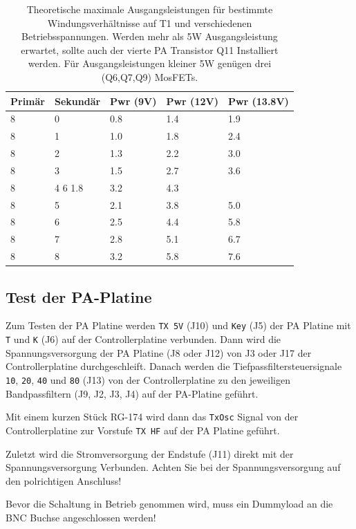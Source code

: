 \documentclass[10pt, a4paper]{paper}
\newcommand{\warn}[1]{{\color{red} #1}}
\newcommand{\con}[1]{\texttt{#1}}
\begin{document}
\begin{table}[!ht]
 \centering
 \begin{tabular}{|l|l|l|l|l|} \hline
  Primär & Sekundär & Pwr (9V) & Pwr (12V) & Pwr (13.8V) \\ \hline
  8 & 0 & 0.8 & 1.4 & 1.9 \\
  8 & 1 & 1.0 & 1.8 & 2.4 \\
  8 & 2 & 1.3 & 2.2 & 3.0 \\
  8 & 3 & 1.5 & 2.7 & 3.6 \\
  8 & 4 6 1.8 & 3.2 & 4.3 \\
  8 & 5 & 2.1 & 3.8 & 5.0 \\
  8 & 6 & 2.5 & 4.4 & \warn{5.8} \\
  8 & 7 & 2.8 & \warn{5.1} & \warn{6.7} \\
  8 & 8 & 3.2 & \warn{5.8} & \warn{7.6} \\ \hline 
 \end{tabular}
 \caption{Theoretische maximale Ausgangsleistungen für bestimmte Windungsverhältnisse auf T1 und verschiedenen Betriebsspannungen. \warn{Werden mehr als 5W Ausgangsleistung erwartet, sollte auch der vierte PA Transistor Q11 Installiert werden. Für Ausgangsleistungen kleiner 5W genügen drei (Q6,Q7,Q9) MosFETs.}} \label{tab:Pout} 
\end{table}


\subsection{Test der PA-Platine}
Zum Testen der PA Platine werden \con{TX 5V} (J10) und \con{Key} (J5) der PA Platine mit \con{T} und \con{K} (J6) auf der Controllerplatine verbunden. Dann wird die Spannungsversorgung der PA Platine (J8 oder J12) von J3 oder J17 der Controllerplatine durchgeschleift. Danach werden die Tiefpassfiltersteuersignale \con{10}, \con{20}, \con{40} und \con{80} (J13) von der Controllerplatine zu den jeweiligen Bandpassfiltern (J9, J2, J3, J4) auf der PA-Platine geführt.

Mit einem kurzen Stück RG-174 wird dann das \con{TxOsc} Signal von der Controllerplatine zur Vorstufe \con{TX HF} auf der PA Platine geführt.

Zuletzt wird die Stromversorgung der Endstufe (J11) direkt mit der Spannungsversorgung Verbunden.  \warn{Achten Sie bei der Spannungsversorgung auf den polrichtigen Anschluss!}

\warn{Bevor die Schaltung in Betrieb genommen wird, muss ein Dummyload an die BNC Buchse angeschlossen werden!}
\end{document}
